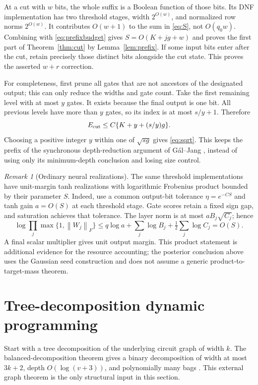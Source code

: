 \documentclass[11pt]{article}
\theoremstyle{remark}\newtheorem{remark}[theorem]{Remark}
\newcommand{\norm}[1]{\left\lVert#1\right\rVert}
\begin{document}
At a cut with $w$ bits, the whole suffix is a Boolean function of
those bits. Its DNF implementation has two threshold stages,
width $2^{O(w)}$, and normalized row norms $2^{O(w)}$.
It contributes $O(w+1)$ to the sum in \eqref{eq:S}, not
$O(q_0w)$. Combining with \eqref{eq:prefixbudget} gives
$S=O(K+jg+w)$ and proves the first part of
Theorem~\ref{thm:cut} by Lemma~\ref{lem:prefix}.
If some input bits enter after the cut, retain precisely those
distinct bits alongside the cut state. This proves the asserted
$w+r$ correction.

For completeness, first prune all gates that are not ancestors of
the designated output; this can only reduce the widths and gate count.
Take the first remaining level with at most $y$ gates.
It exists because the final output is one bit. All previous
levels have more than $y$ gates, so its index is at most
$s/y+1$. Therefore
\[
 E_{\rm cut}\le C\{K+y+(s/y)g\}.
\]
Choosing a positive integer $y$ within one of $\sqrt{sg}$ gives
\eqref{eq:sqrt}. This keeps the prefix of the synchronous
depth-reduction argument of G\'al--Jang \cite{gj}, instead of
using only its minimum-depth conclusion and losing size control.

\begin{remark}[Ordinary neural realizations]
The same threshold implementations have unit-margin tanh
realizations with logarithmic Frobenius product bounded by their
parameter $S$. Indeed, use a common output-bit tolerance
$\eta=e^{-CS}$ and tanh gain $a=O(S)$ at each threshold stage.
Gate scores retain a fixed sign gap, and saturation achieves that
tolerance. The layer norm is at most $aB_j\sqrt{C_j}$; hence
\[
 \log\prod_j\max\{1,\norm{W_j}_F\}
 \le q\log a+\sum_j\log B_j+\tfrac12\sum_j\log C_j
 =O(S).
\]
A final scalar multiplier gives unit output margin. This product
statement is additional evidence for the resource accounting;
the posterior conclusion above uses the Gaussian seed construction
and does not assume a generic product-to-target-mass theorem.
\end{remark}

\section{Tree-decomposition dynamic programming}
Start with a tree decomposition of the underlying circuit graph
of width $k$. The balanced-decomposition theorem gives a binary
decomposition of width at most $3k+2$, depth $O(\log(v+3))$, and
polynomially many bags \cite[Lemma 1]{js}. This external graph
theorem is the only structural input in this section.
\end{document}
